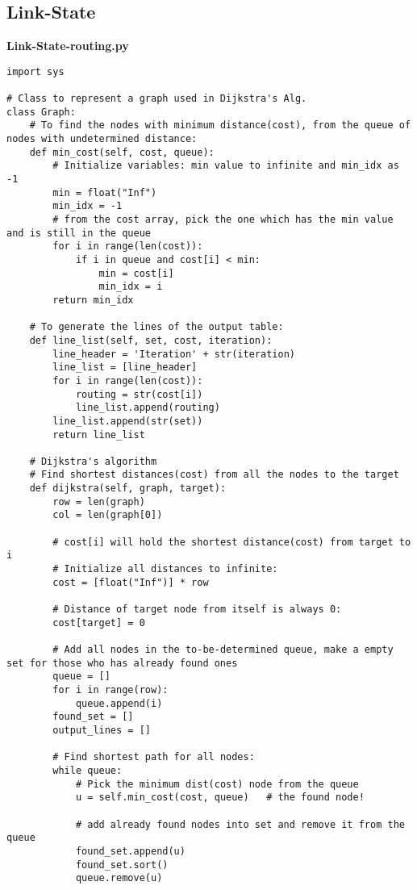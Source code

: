 \documentclass[12pt]{article}
\begin{document}
\subsection{Link-State}
\noindent\textbf{Link-State-routing.py}
\begin{verbatim}
import sys

# Class to represent a graph used in Dijkstra's Alg.
class Graph:
    # To find the nodes with minimum distance(cost), from the queue of nodes with undetermined distance:
    def min_cost(self, cost, queue):
        # Initialize variables: min value to infinite and min_idx as -1
        min = float("Inf")
        min_idx = -1
        # from the cost array, pick the one which has the min value and is still in the queue
        for i in range(len(cost)):
            if i in queue and cost[i] < min:
                min = cost[i]
                min_idx = i
        return min_idx

    # To generate the lines of the output table:
    def line_list(self, set, cost, iteration):
        line_header = 'Iteration' + str(iteration)
        line_list = [line_header]
        for i in range(len(cost)):
            routing = str(cost[i])
            line_list.append(routing)
        line_list.append(str(set))
        return line_list

    # Dijkstra's algorithm
    # Find shortest distances(cost) from all the nodes to the target
    def dijkstra(self, graph, target):
        row = len(graph)
        col = len(graph[0])

        # cost[i] will hold the shortest distance(cost) from target to i
        # Initialize all distances to infinite:
        cost = [float("Inf")] * row

        # Distance of target node from itself is always 0:
        cost[target] = 0

        # Add all nodes in the to-be-determined queue, make a empty set for those who has already found ones
        queue = []
        for i in range(row):
            queue.append(i)
        found_set = []
        output_lines = []

        # Find shortest path for all nodes:
        while queue:
            # Pick the minimum dist(cost) node from the queue
            u = self.min_cost(cost, queue)   # the found node!

            # add already found nodes into set and remove it from the queue
            found_set.append(u)
            found_set.sort()
            queue.remove(u)


\end{verbatim}
\end{document}
